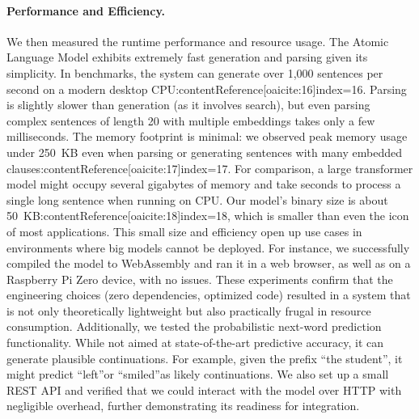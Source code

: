 \documentclass[11pt]{article}
\begin{document}
\paragraph{Performance and Efficiency.} We then measured the runtime performance and resource usage. The Atomic Language Model exhibits extremely fast generation and parsing given its simplicity. In benchmarks, the system can generate over 1,000 sentences per second on a modern desktop CPU:contentReference[oaicite:16]{index=16}. Parsing is slightly slower than generation (as it involves search), but even parsing complex sentences of length 20 with multiple embeddings takes only a few milliseconds. The memory footprint is minimal: we observed peak memory usage under 250~KB even when parsing or generating sentences with many embedded clauses:contentReference[oaicite:17]{index=17}. For comparison, a large transformer model might occupy several gigabytes of memory and take seconds to process a single long sentence when running on CPU. Our model's binary size is about 50~KB:contentReference[oaicite:18]{index=18}, which is smaller than even the icon of most applications. This small size and efficiency open up use cases in environments where big models cannot be deployed. For instance, we successfully compiled the model to WebAssembly and ran it in a web browser, as well as on a Raspberry Pi Zero device, with no issues. These experiments confirm that the engineering choices (zero dependencies, optimized code) resulted in a system that is not only theoretically lightweight but also practically frugal in resource consumption. Additionally, we tested the probabilistic next-word prediction functionality. While not aimed at state-of-the-art predictive accuracy, it can generate plausible continuations. For example, given the prefix \textquotedblleft the student\textquotedblright, it might predict \textquotedblleft left\textquotedblright or \textquotedblleft smiled\textquotedblright as likely continuations. We also set up a small REST API and verified that we could interact with the model over HTTP with negligible overhead, further demonstrating its readiness for integration.
\end{document}
